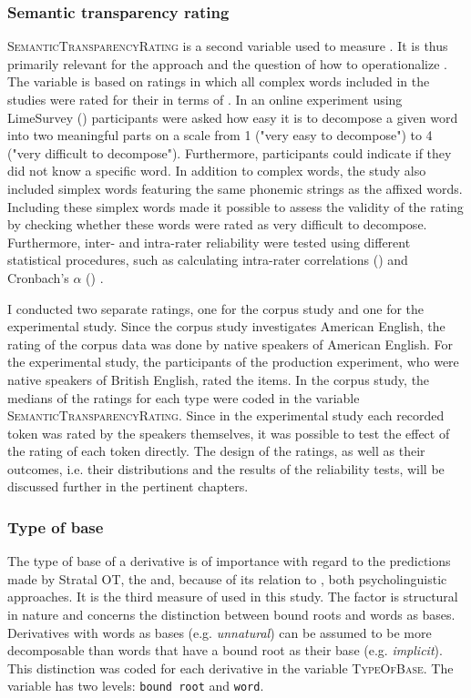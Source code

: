 \subsubsection{Semantic transparency rating} \textsc{SemanticTransparencyRating} is a second variable used to measure . It is thus primarily relevant for the  approach and the question of how to operationalize .  
 The variable is based on ratings in which all complex words included in the studies were rated for their  in terms of .
  In an online experiment using LimeSurvey (\citealt{LimeSurveyProjectTeam.2015}) participants  were asked how easy it is to decompose a given word into two meaningful parts on a scale from 1 ("very easy to decompose") to 4 ("very difficult to decompose"). Furthermore, participants could indicate if they did not know a specific word. In addition to complex words, the study also included simplex words featuring the same phonemic strings as the affixed words. Including these simplex words made it possible to assess the validity of the rating by checking whether these words were rated as very difficult to decompose. Furthermore, inter- and intra-rater reliability were tested using different statistical procedures, such as calculating intra-rater correlations (\citealt{Bartko.1966}) and Cronbach's $\alpha$ (\citealt{Cronbach.1951}) . 

I conducted two separate ratings, one for the corpus study and one for the experimental study. Since the corpus study investigates American English, the rating of the corpus data was done by native speakers of American English. For the experimental study, the participants of the production experiment, who were native speakers of British English, rated the items. 
In the corpus study, the medians of the ratings for each type were coded in the variable \textsc{SemanticTransparencyRating}. Since in the experimental study each recorded token was rated by the speakers themselves, it was possible to test the effect of the rating of each token directly.
The design of the ratings, as well as their outcomes, i.e. their distributions and the results of the reliability tests, will be discussed further in the pertinent chapters.


\subsubsection{Type of base} 
The type of base of a derivative is of importance with regard to the predictions made by Stratal OT, the  and, because of its relation to , both psycholinguistic approaches. It is
the third measure of  used in this study. The factor is structural in nature and concerns the distinction between bound roots and words as bases. Derivatives with words as bases  (e.g. \textit{unnatural}) can be assumed to be more decomposable than words that have a bound root as their base  (e.g. \textit{implicit}). This distinction was coded for each derivative in the variable \textsc{TypeOfBase}. The variable has two levels: \texttt{bound root} and \texttt{word}.


